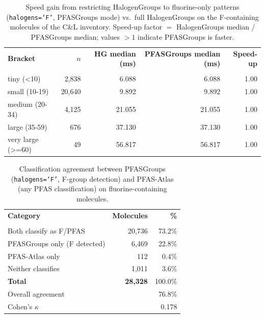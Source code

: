\begin{table}[htbp]
\centering
\caption{Speed gain from restricting HalogenGroups to fluorine-only
  patterns (\texttt{halogens=`F'}, PFASGroups mode) vs.\ full
  HalogenGroups on the F-containing molecules of the C\&L inventory.
  Speed-up factor $=$ HalogenGroups median / PFASGroups median;
  values $>1$ indicate PFASGroups is faster.}
\label{tab:clinventory_pfasgroups_speedup}
\begin{tabular}{lrrrr}
\toprule
\rowcolor[HTML]{D6E4F5}\textbf{Bracket} & \textbf{$n$} & \textbf{HG median (ms)} & \textbf{PFASGroups median (ms)} & \textbf{Speed-up} \\\\
\midrule
  \rowcolor[HTML]{FAEADE}tiny (<10) & 2,838 & 6.088 & 6.088 & 1.00 \\
  small (10-19) & 20,640 & 9.892 & 9.892 & 1.00 \\
  \rowcolor[HTML]{FAEADE}medium (20-34) & 4,125 & 21.055 & 21.055 & 1.00 \\
  large (35-59) & 676 & 37.130 & 37.130 & 1.00 \\
  \rowcolor[HTML]{FAEADE}very large (>=60) & 49 & 56.817 & 56.817 & 1.00 \\
\bottomrule
\end{tabular}
\end{table}

\begin{table}[htbp]
\centering
\caption{Classification agreement between PFASGroups
  (\texttt{halogens=`F'}, F-group detection) and PFAS-Atlas
  (any PFAS classification) on fluorine-containing molecules.}
\label{tab:clinventory_pfasgroups_agreement}
\begin{tabular}{lrr}
\toprule
\rowcolor[HTML]{D6E4F5}\textbf{Category} & \textbf{Molecules} & \textbf{\%} \\\\
\midrule
  \rowcolor[HTML]{FAEADE}Both classify as F/PFAS & 20,736 & 73.2\% \\
  \rowcolor[HTML]{F2DCE9}PFASGroups only (F detected) & 6,469 & 22.8\% \\
  \rowcolor[HTML]{D6E4F5}PFAS-Atlas only & 112 & 0.4\% \\
  Neither classifies & 1,011 & 3.6\% \\
\midrule
  \textbf{Total} & \textbf{28,328} & 100.0\% \\
\midrule
  Overall agreement & \multicolumn{2}{r}{76.8\%} \\
  Cohen's $\kappa$ & \multicolumn{2}{r}{0.178} \\
\bottomrule
\end{tabular}
\end{table}
